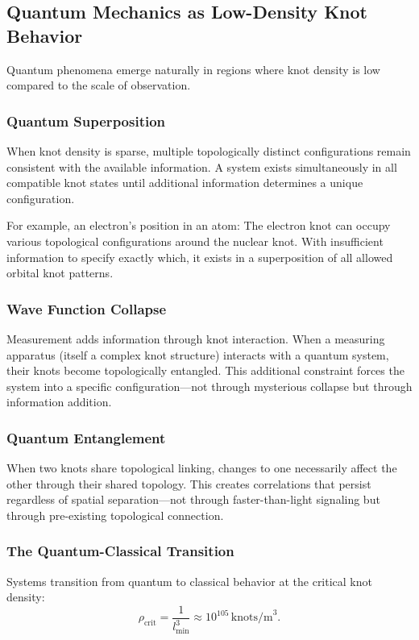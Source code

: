 \documentclass{article}
\begin{document}
\subsection{Quantum Mechanics as Low-Density Knot Behavior}
Quantum phenomena emerge naturally in regions where knot density is low compared to the scale of observation.

\subsubsection{Quantum Superposition}
When knot density is sparse, multiple topologically distinct configurations remain consistent with the available information. A system exists simultaneously in all compatible knot states until additional information determines a unique configuration.

For example, an electron's position in an atom: The electron knot can occupy various topological configurations around the nuclear knot. With insufficient information to specify exactly which, it exists in a superposition of all allowed orbital knot patterns.

\subsubsection{Wave Function Collapse}
Measurement adds information through knot interaction. When a measuring apparatus (itself a complex knot structure) interacts with a quantum system, their knots become topologically entangled. This additional constraint forces the system into a specific configuration—not through mysterious collapse but through information addition.

\subsubsection{Quantum Entanglement}
When two knots share topological linking, changes to one necessarily affect the other through their shared topology. This creates correlations that persist regardless of spatial separation—not through faster-than-light signaling but through pre-existing topological connection.

\subsubsection{The Quantum-Classical Transition}
Systems transition from quantum to classical behavior at the critical knot density:
\[
\rho_{\text{crit}} = \frac{1}{l_{\min}^3} \approx 10^{105} \, \text{knots/m}^3.
\]
\end{document}
